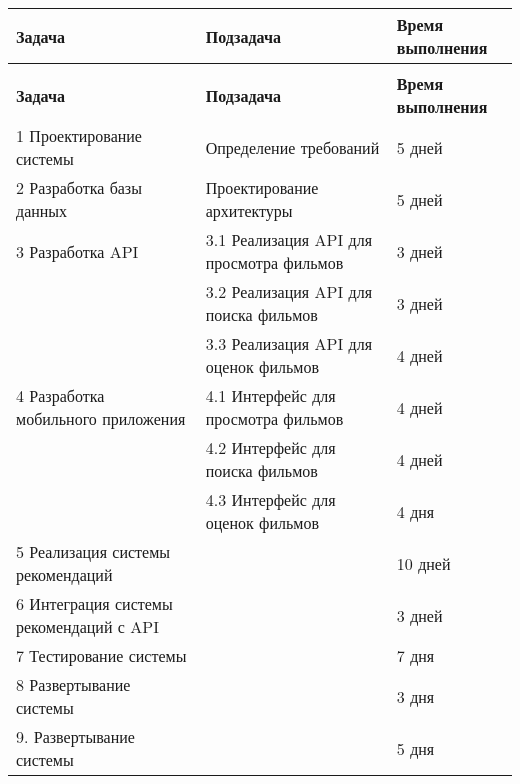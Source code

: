 \begin{longtable}{|p{6cm}|p{5cm}|p{4cm}|}
	\caption{} \label{table:stages} \\
	\hline
	\textbf{Задача}
	& \textbf{Подзадача}
	& \textbf{Время выполнения} \\
	\hline
	\endfirsthead
	\conttable{table:stages} \\
	\hline
	\textbf{Задача}
	& \textbf{Подзадача}
	& \textbf{Время выполнения} \\
	\hline
	\endhead
	1 Проектирование системы
	& Определение требований
	& 5 дней \\ \hline

	2 Разработка базы данных
	& Проектирование архитектуры
	& 5 дней \\ \hline

	3 Разработка API
	& 3.1 Реализация API для просмотра фильмов
	& 3 дней \\ \hline

	& 3.2 Реализация API для поиска фильмов
	& 3 дней \\ \hline

	& 3.3 Реализация API для оценок фильмов
	& 4 дней \\ \hline

	4 Разработка мобильного приложения
	& 4.1 Интерфейс для просмотра фильмов
	& 4 дней \\ \hline

	& 4.2 Интерфейс для поиска фильмов
	& 4 дней \\ \hline

	& 4.3 Интерфейс для оценок фильмов
	& 4 дня \\ \hline

	5 Реализация системы рекомендаций
	&
	& 10 дней \\ \hline

	6 Интеграция системы рекомендаций с API
	&
	& 3 дней \\ \hline

	7 Тестирование системы
	&
	& 7 дня \\ \hline

	8 Развертывание системы
	&
	& 3 дня \\ \hline

	9. Развертывание системы
	&
	& 5 дня \\ \hline
\end{longtable}



